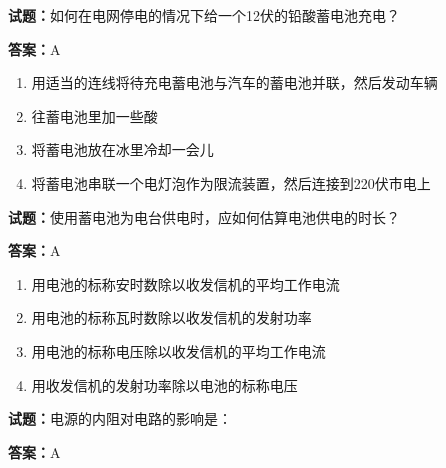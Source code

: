 \documentclass{ctexbook}
\begin{document}




\vspace{1em}

\textbf{试题：}如何在电网停电的情况下给一个12伏的铅酸蓄电池充电？ 

\textbf{答案：}A 

\begin{enumerate}[leftmargin=3em]
  \item 用适当的连线将待充电蓄电池与汽车的蓄电池并联，然后发动车辆 

  \item 往蓄电池里加一些酸 

  \item 将蓄电池放在冰里冷却一会儿 

  \item 将蓄电池串联一个电灯泡作为限流装置，然后连接到220伏市电上 

\end{enumerate}





\vspace{1em}

\textbf{试题：}使用蓄电池为电台供电时，应如何估算电池供电的时长？ 

\textbf{答案：}A 

\begin{enumerate}[leftmargin=3em]
  \item 用电池的标称安时数除以收发信机的平均工作电流 

  \item 用电池的标称瓦时数除以收发信机的发射功率 

  \item 用电池的标称电压除以收发信机的平均工作电流 

  \item 用收发信机的发射功率除以电池的标称电压 


\end{enumerate}





\vspace{1em}

\textbf{试题：}电源的内阻对电路的影响是： 

\textbf{答案：}A 
\end{document}
